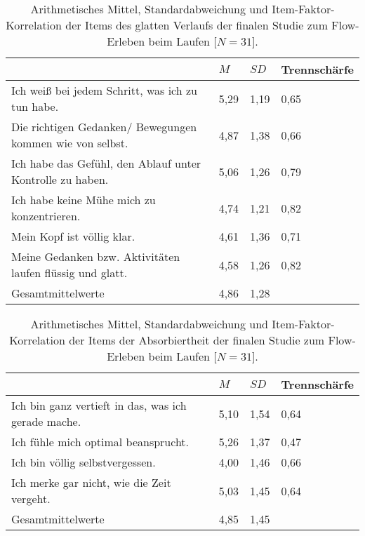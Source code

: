 \begin{table}
	[!htb] \centering \caption[Item-Faktor-Korrelation der Items des glatten Verlaufs (Laufstudie -- interindividuell).]{Arithmetisches Mittel, Standardabweichung und Item-Faktor-Korrelation der Items des glatten Verlaufs der finalen Studie zum Flow-Erleben beim Laufen [$N = 31$].} \label{tab:glatter_verlauf_3} 
	\begin{tabularx}
		{ 
		\textwidth}{p{} p{} p{} p{}} \toprule & $M$ & $SD$ & Trennschärfe \\
		\midrule Ich weiß bei jedem Schritt, was ich zu tun habe. & 5,29 & 1,19 & 0,65 \\
		Die richtigen Gedanken/ Bewegungen kommen wie von selbst. & 4,87 & 1,38 & 0,66 \\
		Ich habe das Gefühl, den Ablauf unter Kontrolle zu haben. & 5,06 & 1,26 & 0,79 \\
		Ich habe keine Mühe mich zu konzentrieren. & 4,74 & 1,21 & 0,82 \\
		Mein Kopf ist völlig klar. & 4,61 & 1,36 & 0,71 \\
		Meine Gedanken bzw. Aktivitäten laufen flüssig und glatt. & 4,58 & 1,26 & 0,82 \\
		Gesamtmittelwerte & 4,86 & 1,28 & \\
		\bottomrule 
	\end{tabularx}
\end{table}
\begin{table}
	[!htb] \centering \caption[Item-Faktor-Korrelation der Items der Absorbiertheit (Laufstudie -- interindividuell).]{Arithmetisches Mittel, Standardabweichung und Item-Faktor-Korrelation der Items der Absorbiertheit der finalen Studie zum Flow-Erleben beim Laufen [$N = 31$].} \label{tab:absorbiertheit_3} 
	\begin{tabularx}
		{ 
		\textwidth}{p{} p{} p{} p{}} \toprule & $M$ & $SD$ & Trennschärfe \\
		\midrule Ich bin ganz vertieft in das, was ich gerade mache. & 5,10 & 1,54 & 0,64 \\
		Ich fühle mich optimal beansprucht. & 5,26 & 1,37 & 0,47 \\
		Ich bin völlig selbstvergessen. & 4,00 & 1,46 & 0,66 \\
		Ich merke gar nicht, wie die Zeit vergeht. & 5,03 & 1,45 & 0,64 \\
		Gesamtmittelwerte & 4,85 & 1,45 & \\
		\bottomrule 
	\end{tabularx}
\end{table}

